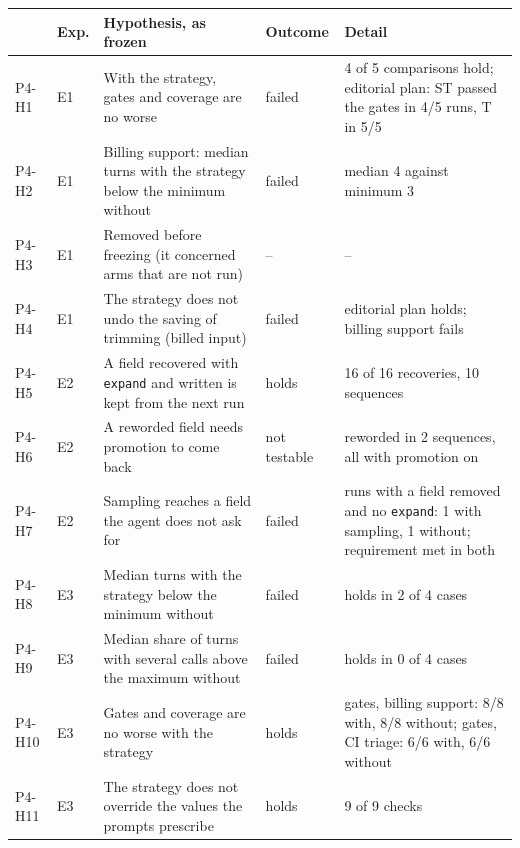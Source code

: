\begin{tabular}{llp{6.2cm}lp{5.2cm}}
\toprule
& Exp. & Hypothesis, as frozen & Outcome & Detail \\
\midrule
P4-H1 & E1 & With the strategy, gates and coverage are no worse & failed & 4 of 5 comparisons hold; editorial plan: ST passed the gates in 4/5 runs, T in 5/5 \\
P4-H2 & E1 & Billing support: median turns with the strategy below the minimum without & failed & median 4 against minimum 3 \\
P4-H3 & E1 & Removed before freezing (it concerned arms that are not run) & -- & -- \\
P4-H4 & E1 & The strategy does not undo the saving of trimming (billed input) & failed & editorial plan holds; billing support fails \\
P4-H5 & E2 & A field recovered with \texttt{expand} and written is kept from the next run & holds & 16 of 16 recoveries, 10 sequences \\
P4-H6 & E2 & A reworded field needs promotion to come back & not testable & reworded in 2 sequences, all with promotion on \\
P4-H7 & E2 & Sampling reaches a field the agent does not ask for & failed & runs with a field removed and no \texttt{expand}: 1 with sampling, 1 without; requirement met in both \\
P4-H8 & E3 & Median turns with the strategy below the minimum without & failed & holds in 2 of 4 cases \\
P4-H9 & E3 & Median share of turns with several calls above the maximum without & failed & holds in 0 of 4 cases \\
P4-H10 & E3 & Gates and coverage are no worse with the strategy & holds & gates, billing support: 8/8 with, 8/8 without; gates, CI triage: 6/6 with, 6/6 without \\
P4-H11 & E3 & The strategy does not override the values the prompts prescribe & holds & 9 of 9 checks \\
\bottomrule
\end{tabular}
